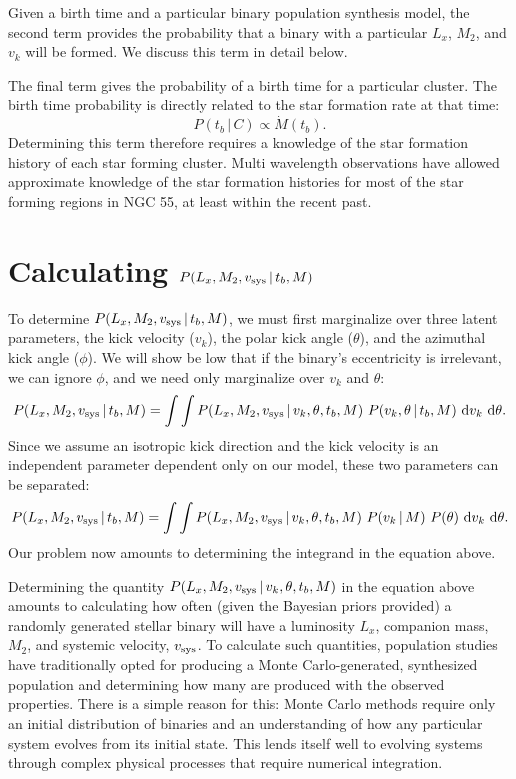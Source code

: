 \documentclass[12pt, preprint]{aastex}
\newcommand{\given}{\,|\,}
\newcommand{\dd}{\mathrm{d}}
\begin{document}
Given a birth time and a particular binary population synthesis model, the second term provides the probability that a binary with a particular $L_x$, $M_2$, and $v_k$ will be formed. We discuss this term in detail below.

The final term gives the probability of a birth time for a particular cluster. The birth time probability is directly related to the star formation rate at that time:
\begin{equation}
P(t_b \given C) \propto \dot{M}(t_b).
\end{equation} 
Determining this term therefore requires a knowledge of the star formation history of each star forming cluster. Multi wavelength observations have allowed approximate knowledge of the star formation histories for most of the star forming regions in NGC 55, at least within the recent past.

 
 
\section{Calculating $P(L_x, M_2, v_{\rm sys} \given t_b, M)$}

To determine $P(L_x, M_2, v_{\rm sys} \given t_b, M)$, we must first marginalize over three latent parameters, the kick velocity ($v_k$), the polar kick angle ($\theta$), and the azimuthal kick angle ($\phi$). We will show be low that if the binary's eccentricity is irrelevant, we can ignore $\phi$, and we need only marginalize over $v_k$ and $\theta$:
\begin{equation}
P(L_x, M_2, v_{\rm sys} \given t_b, M) = \int \int P(L_x, M_2, v_{\rm sys} \given v_k, \theta, t_b, M)\ P(v_k, \theta \given t_b, M)\ \dd v_k\ \dd \theta.
\end{equation}
Since we assume an isotropic kick direction and the kick velocity is an independent parameter dependent only on our model, these two parameters can be separated:
\begin{equation}
P(L_x, M_2, v_{\rm sys} \given t_b, M) = \int \int P(L_x, M_2, v_{\rm sys} \given v_k, \theta, t_b, M)\ P(v_k \given M)\ P(\theta)\ \dd v_k\ \dd \theta. \label{eq:P_marginalized}
\end{equation}
Our problem now amounts to determining the integrand in the equation above.


Determining the quantity $P(L_x, M_2, v_{\rm sys} \given v_k, \theta, t_b, M)$ in the equation above amounts to calculating how often (given the Bayesian priors provided) a randomly generated stellar binary will have a luminosity $L_x$, companion mass, $M_2$, and systemic velocity, $v_{\rm sys}$. To calculate such quantities, population studies have traditionally opted for producing a Monte Carlo-generated, synthesized population and determining how many are produced with the observed properties. There is a simple reason for this: Monte Carlo methods require only an initial distribution of binaries and an understanding of how any particular system evolves from its initial state. This lends itself well to evolving systems through complex physical processes that require numerical integration. 
\end{document}
